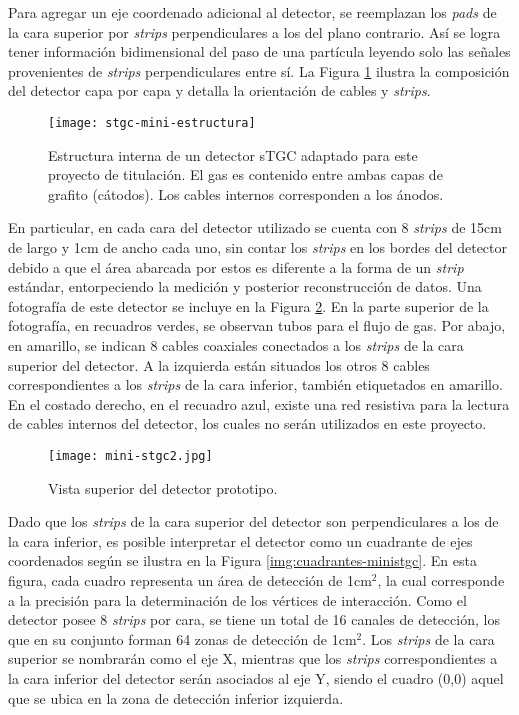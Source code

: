 	Para agregar un eje coordenado adicional al detector, se reemplazan los \textit{pads} de la cara superior por \textit{strips} perpendiculares a los del plano contrario. Así se logra tener información bidimensional del paso de una partícula leyendo solo las señales provenientes de \textit{strips} perpendiculares entre sí. La Figura \ref{img:stgc-mini-estructura} ilustra la composición del detector capa por capa y detalla la orientación de cables y \textit{strips}.
	
	\begin{figure}[h]
		\centering
		\texttt{[image: stgc-mini-estructura]}
		\caption{Estructura interna de un detector sTGC adaptado para este proyecto de titulación. El gas es contenido entre ambas capas de grafito (cátodos). Los cables internos corresponden a los ánodos.}
		\label{img:stgc-mini-estructura}
	\end{figure}

	En particular, en cada cara del detector utilizado se cuenta con 8 \textit{strips} de 15cm de largo y 1cm de ancho cada uno, sin contar los \textit{strips} en los bordes del detector debido a que el área abarcada por estos es diferente a la forma de un \textit{strip} estándar, entorpeciendo la medición y posterior reconstrucción de datos. %
Una fotografía de este detector se incluye en la Figura \ref{img:foto-mini-stgc}. En la parte superior de la fotografía, en recuadros verdes, se observan tubos para el flujo de gas. Por abajo, en amarillo, se indican 8 cables coaxiales conectados a los \textit{strips} de la cara superior del detector. A la izquierda están situados los otros 8 cables correspondientes a los \textit{strips} de la cara inferior, también etiquetados en amarillo. En el costado derecho, en el recuadro azul, existe una red resistiva para la lectura de cables internos del detector, los cuales no serán utilizados en este proyecto. %
	
	\begin{figure}[h]
		\centering
		\texttt{[image: mini-stgc2.jpg]}
		\caption{Vista superior del detector prototipo.}
		\label{img:foto-mini-stgc}
	\end{figure}	
	
	Dado que los \textit{strips} de la cara superior del detector son perpendiculares a los de la cara inferior, es posible interpretar el detector como un cuadrante de ejes coordenados según se ilustra en la Figura \ref{img:cuadrantes-ministgc}. En esta figura, cada cuadro representa un área de detección de 1cm$^2$, la cual corresponde a la precisión para la determinación de los vértices de interacción. Como el detector posee 8 \textit{strips} por cara, se tiene un total de 16 canales de detección, los que en su conjunto forman 64 zonas de detección de 1cm$^2$. Los \textit{strips} de la cara superior se nombrarán como el eje X, mientras que los \textit{strips} correspondientes a la cara inferior del detector serán asociados al eje Y, siendo el cuadro (0,0) aquel que se ubica en la zona de detección inferior izquierda.
	
